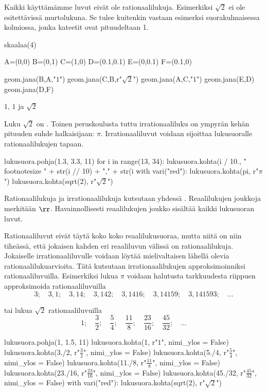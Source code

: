 Kaikki käyttämämme luvut eivät ole rationaalilukuja. Esimerkiksi $\sqrt{2}$ ei ole esitettävissä murtolukuna. Se tulee kuitenkin vastaan esimerksi suorakulmaisessa kolmiossa, jonka kateetit ovat pituudeltaan 1.


\begin{kuva}
	skaalaa(4)

	A=(0,0)
	B=(0,1)
	C=(1,0)
	D=(0.1,0.1)
	E=(0,0.1)
	F=(0.1,0)

	geom.jana(B,A,"$1$")
	geom.jana(C,B,r"$\sqrt{2}$")
	geom.jana(A,C,"$1$")
	geom.jana(E,D)
	geom.jana(D,F)
\end{kuva}


$1$, $1$ ja $\sqrt{2}$

Luku $\sqrt{2}$ on . Toinen peruskoulusta tuttu irrationaaliluku on ympyrän kehän pituuden suhde halkaisijaan: $\pi$. Irrationaaliluvut voidaan sijoittaa
lukusuoralle rationaalilukujen tapaan.

\begin{kuva}
lukusuora.pohja(1.3, 3.3, 11)
for i in range(13, 34):
	lukusuora.kohta(i / 10., "\\footnotesize " + str(i // 10) + "," + str(i %
with vari("red"):
	lukusuora.kohta(pi, r"$\pi$")
	lukusuora.kohta(sqrt(2), r"$\sqrt{2}$")
\end{kuva}



Rationaalilukuja ja irrationaalilukuja kutsutaan yhdessä . Reaalilukujen joukkoja merkitään $\rr$.
Havainnollisesti reaalilukujen joukko sisältää kaikki lukusuoran luvut.

Rationaaliluvut eivät täytä koko koko reaalilukusuoraa, mutta niitä on niin tiheässä, että jokaisen kahden eri reaaliluvun välissä on rationaalilukuja. Jokaiselle irrationaaliluvulle voidaan löytää mielivaltaisen lähellä olevia rationaalilukuarvioita. Tätä kutsutaan irrationaalilukujen approksimoinniksi rationaaliluvuilla. Esimerkiksi lukua $\pi$ voidaan halutusta tarkkuudesta riippuen approksimoida rationaaliluvuilla
\[
3; \quad 3,1; \quad 3,14; \quad 3,142; \quad 3,1416; \quad 3,14159; \quad 3,141593; \quad \ldots 
\]

tai lukua $\sqrt{2}$ rationaaliluvuilla
\[
1; \quad \frac{3}{2}; \quad \frac{5}{4}; \quad \frac{11}{8}; \quad \frac{23}{16}; \quad \frac{45}{32}; \quad \ldots 
\]

\begin{kuva}
lukusuora.pohja(1, 1.5, 11)
lukusuora.kohta(1, r"\footnotesize $1$", nimi_ylos = False)
lukusuora.kohta(3./2, r"\footnotesize $\frac{3}{2}$", nimi_ylos = False)
lukusuora.kohta(5./4, r"\footnotesize $\frac{5}{4}$", nimi_ylos = False)
lukusuora.kohta(11./8, r"\footnotesize $\frac{11}{8}$", nimi_ylos = False)
lukusuora.kohta(23./16, r"\footnotesize $\frac{23}{16}$", nimi_ylos = False)
lukusuora.kohta(45./32, r"\footnotesize $\frac{45}{32}$", nimi_ylos = False)
with vari("red"):
	lukusuora.kohta(sqrt(2), r"$\sqrt{2}$")
\end{kuva}

